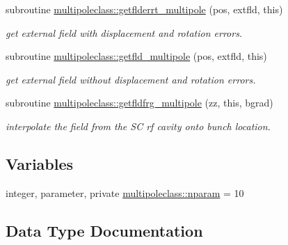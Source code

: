 \begin{DoxyCompactItemize}
subroutine \mbox{\hyperlink{namespacemultipoleclass_ab9a8281befade6912e33564f4db52877}{multipoleclass\+::getflderrt\+\_\+multipole}} (pos, extfld, this)
\begin{DoxyCompactList}\small\item\em get external field with displacement and rotation errors. \end{DoxyCompactList}\item 
subroutine \mbox{\hyperlink{namespacemultipoleclass_af4fb9d3cfd9db2d92930fcda605fbe26}{multipoleclass\+::getfld\+\_\+multipole}} (pos, extfld, this)
\begin{DoxyCompactList}\small\item\em get external field without displacement and rotation errors. \end{DoxyCompactList}\item 
subroutine \mbox{\hyperlink{namespacemultipoleclass_a8712b7622d8ed7c0e71cdc18204dcf46}{multipoleclass\+::getfldfrg\+\_\+multipole}} (zz, this, bgrad)
\begin{DoxyCompactList}\small\item\em interpolate the field from the SC rf cavity onto bunch location. \end{DoxyCompactList}\end{DoxyCompactItemize}
\subsection*{Variables}
\begin{DoxyCompactItemize}
\item 
integer, parameter, private \mbox{\hyperlink{namespacemultipoleclass_a67bb1a71461cf39cdd365adab7fec8b9}{multipoleclass\+::nparam}} = 10
\end{DoxyCompactItemize}


\subsection{Data Type Documentation}
\label{structmultipoleclass_1_1multipole}
